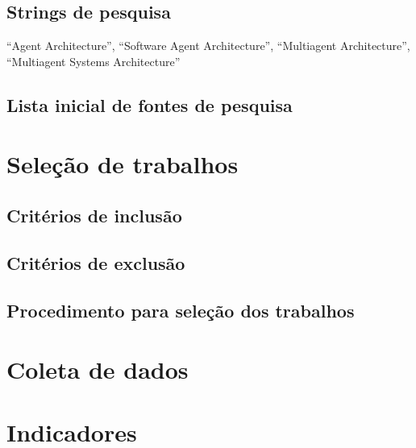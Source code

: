\subsection{Strings de pesquisa}


“Agent Architecture”, “Software Agent Architecture”,
“Multiagent Architecture”, “Multiagent Systems Architecture”

\subsection{Lista inicial de fontes de pesquisa}

\section{Seleção de trabalhos}

\subsection{Critérios de inclusão}

\subsection{Critérios de exclusão}

\subsection{Procedimento para seleção dos trabalhos}

\section{Coleta de dados}

\section{Indicadores}















